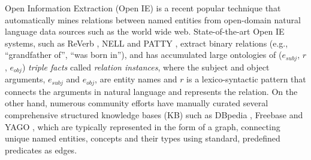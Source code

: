 Open Information Extraction (Open IE) is a recent popular technique
that automatically mines relations between named entities
from open-domain natural language
data sources such as the world wide web.
State-of-the-art Open IE systems, such as ReVerb \cite{fader2011identifying},
NELL \cite{carlson2010toward} and PATTY \cite{nakashole2012patty}, extract binary
relations (e.g., ``grandfather of'', ``was born in''), and has accumulated large
ontologies of ($e_{subj}$, $r$, $e_{obj}$) {\em triple facts} called {\em relation instances},
where the subject and object arguments, $e_{subj}$ and $e_{obj}$,
are entity names and $r$ is a lexico-syntactic pattern that connects
the arguments in natural language and represents the relation.
On the other hand, numerous community efforts have
manually curated several comprehensive structured knowledge bases (KB)
such as DBpedia \cite{auer2007dbpedia},
Freebase \cite{bollacker2008freebase} and YAGO \cite{suchanek2007yago},
which are typically represented in the form of a graph,
connecting unique named entities, concepts and their types
using standard, predefined predicates as edges.


